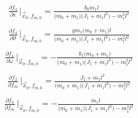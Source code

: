 \documentclass[11pt,a4paper,oneside]{book}
\numberwithin{equation}{section}
\theoremstyle{it}
\theoremstyle{definition}
\begin{document}
\begin{equation}\label{pendulum_on_cart_21}
	\begin{aligned}
		\frac{\partial f_4}{\partial v}\,\Big|_{\vec{x}_0,f_{m,0}}=\frac{b_0m_1l}{\big(m_0+m_1\big)\big(J_1+m_1l^2\big)-m_1^2l^2}\\[6pt]
	\end{aligned}
\end{equation}
\begin{equation}\label{pendulum_on_cart_22}
	\begin{aligned}
		\frac{\partial f_4}{\partial \vartheta}\,\Big|_{\vec{x}_0,f_{m,0}}=\frac{gm_1\big(m_0+m_1\big)l}{\big(m_0+m_1\big)\big(J_1+m_1l^2\big)-m_1^2l^2}\\[6pt]
	\end{aligned}
\end{equation}
\begin{equation}\label{pendulum_on_cart_23}
	\begin{aligned}
		\frac{\partial f_4}{\partial \omega}\,\Big|_{\vec{x}_0,f_{m,0}}=-\frac{b_1\big(m_0+m_1\big)}{\big(m_0+m_1\big)\big(J_1+m_1l^2\big)-m_1^2l^2}\\[6pt]
	\end{aligned}
\end{equation}
\begin{equation}\label{pendulum_on_cart_24}
	\begin{aligned}
		\frac{\partial f_2}{\partial f_m}\,\Big|_{\vec{x}_0,f_{m,0}}=\frac{J_1+m_1l^2}{\big(m_0+m_1\big)\big(J_1+m_1l^2\big)-m_1^2l^2}\\[6pt]
	\end{aligned}
\end{equation}
\begin{equation}\label{pendulum_on_cart_25}
	\begin{aligned}
		\frac{\partial f_4}{\partial f_m}\,\Big|_{\vec{x}_0,f_{m,0}}=-\frac{m_1l}{\big(m_0+m_1\big)\big(J_1+m_1l^2\big)-m_1^2l^2}\\[6pt]
	\end{aligned}
\end{equation}
\end{document}
